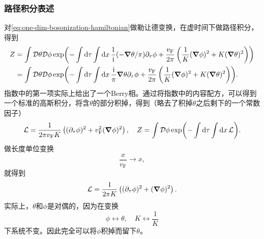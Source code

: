 \documentclass[hyperref, UTF8, a4paper]{ctexart}
\newcommand*{\ii}{\mathrm{i}}
\newcommand*{\fd}[1]{\mathcal{D} #1}
\begin{document}
\subsubsection{路径积分表述}

对\eqref{eq:one-dim-bosonization-hamiltonian}做勒让德变换，在虚时间下做路径积分，得到
\[
    \begin{aligned}
        Z &= \int \fd{\theta} \fd{\phi} \exp(- \int \dd{\tau} \int \dd{x} \frac{1}{\ii} (- \grad{\theta} / \pi) \partial_\tau \phi + \frac{v_\text{F}}{2\pi} \left( \frac{1}{K} (\grad{\phi})^2 + K (\grad{\theta})^2 \right) ) \\
        &= \int \fd{\theta} \fd{\phi} \exp(- \int \dd{\tau} \int \dd{x} \frac{\ii}{\pi} \grad{\theta} \partial_\tau \phi + \frac{v_\text{F}}{2\pi} \left( \frac{1}{K} (\grad{\phi})^2 + K (\grad{\theta})^2 \right) ).
    \end{aligned}
\]
指数中的第一项实际上给出了一个Berry相。通过将指数中的内容配方，可以得到一个标准的高斯积分，将含$\theta$的部分积掉，得到（略去了积掉$\theta$之后剩下的一个常数因子）
\begin{equation}
    \mathcal{L} = \frac{1}{2\pi v_\text{F} K} \left( (\partial_\tau \phi)^2 + v_\text{F}^2 (\grad{\phi})^2 \right) , \quad Z = \int \fd{\phi} \exp(- \int \dd{\tau} \int \dd{x} \mathcal{L} ).
\end{equation}
做长度单位变换
\[
    \frac{x}{v_\text{F}} \longrightarrow x,
\]
就得到
\begin{equation}
    \mathcal{L} = \frac{1}{2\pi K} \left( (\partial_\tau \phi)^2 + (\grad{\phi})^2 \right).
    \label{eq:one-dim-scaleless-lag}
\end{equation}
实际上，$\theta$和$\phi$是对偶的，因为在变换
\[
    \phi \longleftrightarrow \theta, \quad K \longleftrightarrow \frac{1}{K}
\]
下系统不变。因此完全可以将$\phi$积掉而留下$\theta$。
\end{document}
